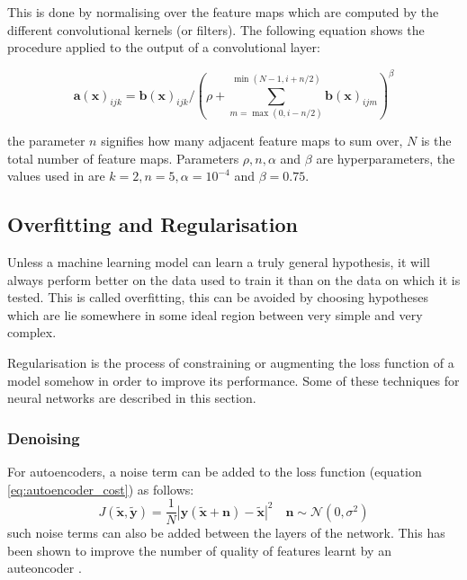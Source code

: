     This is done by normalising over the feature maps which are computed by the different convolutional kernels (or filters).
    The following equation shows the procedure applied to the output of a convolutional layer:

    \begin{equation} \label{eq:lrn}
      \mathbf{a}(\mathbf{x})_{ijk}
      = \mathbf{b}(\mathbf{x})_{ijk}/\left (\rho + \sum^{\min(N-1,i+n/2)}_{m=\max(0,i-n/2)}\mathbf{b}(\mathbf{x})_{ijm} \right )^\beta
    \end{equation}

    the parameter $n$ signifies how many adjacent feature maps to sum over, $N$ is the total number of feature maps.
    Parameters $\rho,n,\alpha$ and $\beta$ are hyperparameters, the values used in \cite{Krizhevsky2012} are
    $k=2,n=5,\alpha=10^{-4}$ and $\beta=0.75$.

  \subsection{Overfitting and Regularisation}
    Unless a machine learning model can learn a truly general hypothesis, it will always perform
    better on the data used to train it than on the data on which it is tested. This is
    called overfitting, this can be avoided by choosing hypotheses which are lie somewhere
    in some ideal region between very simple and very complex.

    Regularisation is the process of constraining or augmenting
    the loss function of a model \cite{Bishop2006} somehow in order to improve its performance.
    Some of these techniques for neural networks are described in this section.
    \subsubsection{Denoising}
      For autoencoders, a noise term can be added to the loss function (equation \ref{eq:autoencoder_cost}) as follows:
      \begin{equation} \label{eq:autoencoder_cost_noise}
        J(\tilde{\mathbf{x}},\tilde{\mathbf{y}}) = \frac{1}{N}\left |\mathbf{y}(\tilde{\mathbf{x}}+\mathbf{n})-\tilde{\mathbf{x}}\right | ^2\quad \mathbf{n} \sim \mathbf{\mathcal{N}}(0,\sigma^2)
      \end{equation}
      such noise terms can also be added between the layers of the network. This
      has been shown to improve the number of quality of features learnt by an auteoncoder \cite{stacks,Vincent2008a}.
